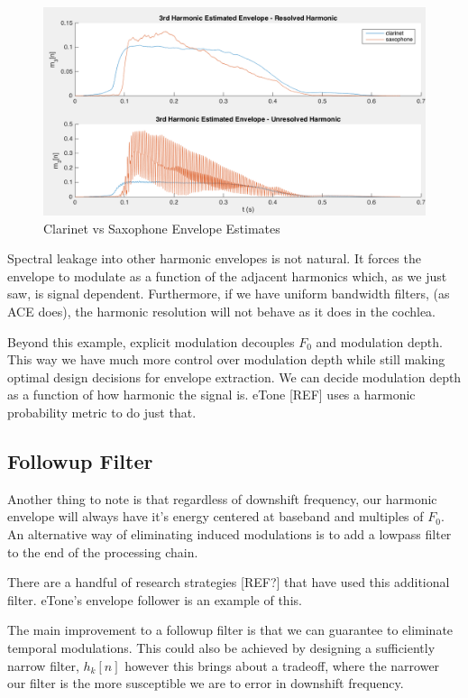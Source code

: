 \documentclass [11pt, proquest] {uwthesis}[2015/03/03]
\begin{document}
\begin{figure}[!ht]
  \centering
    \includegraphics[width=1\textwidth]{clarinetVSsax_T}   
    \caption{Clarinet vs Saxophone Envelope Estimates}\label{fig:clarinetVSsax_T}
\end{figure}

Spectral leakage into other harmonic envelopes is not natural.  It forces the envelope to modulate as a function of the adjacent harmonics which, as we just saw, is signal dependent.  Furthermore, if we have uniform bandwidth filters, (as ACE does), the harmonic resolution will not behave as it does in the cochlea.

Beyond this example, explicit modulation decouples $F_0$ and modulation depth.  This way we have much more control over modulation depth while still making optimal design decisions for envelope extraction.  We can decide modulation depth as a function of how harmonic the signal is.  eTone [REF] uses a harmonic probability metric to do just that.

\subsection{Followup Filter}

Another thing to note is that regardless of downshift frequency, our harmonic envelope will always have it's energy centered at baseband and multiples of $F_0$.  An alternative way of eliminating induced modulations is to add a lowpass filter to the end of the processing chain.

There are a handful of research strategies [REF?] that have used this additional filter.  eTone's envelope follower is an example of this.

The main improvement to a followup filter is that we can guarantee to eliminate temporal modulations.  This could also be achieved by designing a sufficiently narrow filter, $h_k[n]$ however this brings about a tradeoff, where the narrower our filter is the more susceptible we are to error in downshift frequency.
\end{document}
